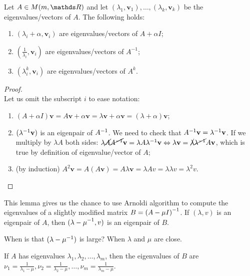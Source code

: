 \documentclass[ComputationalMathematics.tex]{subfiles}
\begin{document}
\begin{lemma}
  Let $A \in M(m, \R)$ and let $(\lambda_1,\mathbf{v}_1),\dots,(\lambda_k,\mathbf{v}_k)$ be the eigenvalues/vectors of $A$. The following holds:

\begin{enumerate}
    \item $(\lambda_i+\alpha, \mathbf{v}_i)$ are eigenvalues/vectors of $A+\alpha I$;
    \item $(\frac{1}{\lambda_i}, \mathbf{v}_i)$ are eigenvalues/vectors of $A^{-1}$;
    \item $(\lambda_i^k, \mathbf{v}_i)$ are eigenvalues/vectors of $A^k$.
\end{enumerate}
\end{lemma}
\begin{proof}~\\
  Let us omit the subscript $i$ to ease notation:~\\
  \begin{enumerate}
    \item $(A + \alpha I)\mathbf{v} = A \mathbf{v} + \alpha \mathbf{v} = \lambda \mathbf{v} + \alpha \mathbf{v} = (\lambda + \alpha) \mathbf{v}$;
    \item $({\lambda}^{-1} \mathbf{v})$ is an eigenpair of ${A}^{-1}$. We need to check that ${A}^{-1} \mathbf{v} = {\lambda}^{-1} \mathbf{v}$. If we multiply by $\lambda A$ both sides: $\lambda \cancel{A} \cancel{{A}^{-1}} \mathbf{v} = \lambda A {\lambda}^{-1} \mathbf{v} \Leftrightarrow \lambda \mathbf{v} = \cancel{\lambda} \cancel{{\lambda}^{-1}} A \mathbf{v}$, which is true by definition of eigenvalue/vector of $A$;
    \item (by induction) $A^2 \mathbf{v} = A (A\mathbf{v}) = A \lambda \mathbf{v} = \lambda A v = \lambda \lambda v = {\lambda}^2 v $.
  \end{enumerate}
\end{proof}

This lemma gives us the chance to use Arnoldi algorithm to compute the eigenvalues of a slightly modified matrix $B = {(A -\mu I)}^{-1}$.
If $(\lambda, v)$ is an eigenpair of $A$, then $( {\lambda - \mu}^{-1}, v)$ is an eigenpair of $B$.

When is that $(\lambda - {\mu}^{-1})$ is large? When $\lambda$ and $\mu$ are close.

If $A$ has eigenvalues $\lambda_1, \lambda_2, \ldots, \lambda_m$, then the eigenvalues of $B$ are $\nu_1 = \frac{1}{\lambda_1 - \mu}, \nu_2 = \frac{1}{\lambda_2 - \mu}, \ldots, \nu_m = \frac{1}{\lambda_m - \mu}$.
\end{document}
